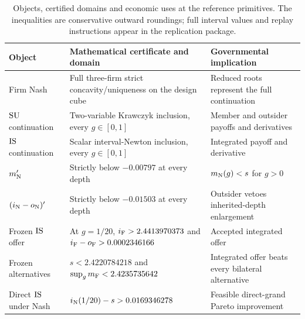 \begin{table}[H]
\centering\scriptsize
\caption{Objects, certified domains and economic uses at the reference primitives. The inequalities are conservative outward roundings; full interval values and replay instructions appear in the replication package.}\label{tab:certificate}
\renewcommand{\arraystretch}{1.17}
\begin{tabularx}{\linewidth}{@{}p{.19\linewidth}p{.34\linewidth}X@{}}
\toprule
Object & Mathematical certificate and domain & Governmental implication\\
\midrule
Firm Nash & Full three-firm strict concavity/uniqueness on the design cube & Reduced roots represent the full continuation\\
$\mathrm{SU}$ continuation & Two-variable Krawczyk inclusion, every $g\in[0,1]$ & Member and outsider payoffs and derivatives\\
$\mathrm{IS}$ continuation & Scalar interval-Newton inclusion, every $g\in[0,1]$ & Integrated payoff and derivative\\
$m'_{\mathrm{N}}$ & Strictly below $-0.00797$ at every depth & $m_{\mathrm{N}}(g)<s$ for $g>0$\\
$(i_{\mathrm{N}}-o_{\mathrm{N}})'$ & Strictly below $-0.01503$ at every depth & Outsider vetoes inherited-depth enlargement\\
Frozen $\mathrm{IS}$ offer & At $g=1/20$, $i_{\mathrm{F}}>2.4413970373$ and $i_{\mathrm{F}}-o_{\mathrm{F}}>0.0002346166$ & Accepted integrated offer\\
Frozen alternatives & $s<2.4220784218$ and $\sup_{g}m_{\mathrm{F}}<2.4235735642$ & Integrated offer beats every bilateral alternative\\
Direct $\mathrm{IS}$ under Nash & $i_{\mathrm{N}}(1/20)-s>0.0169346278$ & Feasible direct-grand Pareto improvement\\
\bottomrule
\end{tabularx}
\end{table}

